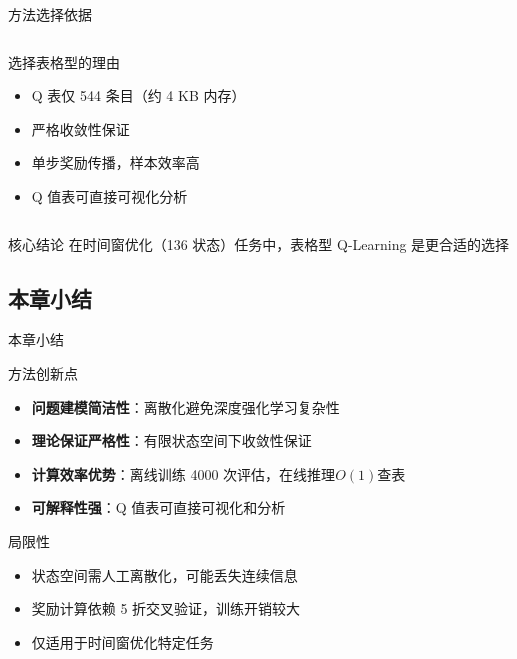 {\begin{frame}{方法选择依据}
\begin{columns}[T]
        \begin{alertblock}{选择表格型的理由}
            \footnotesize
            \begin{itemize}
                \item Q 表仅 544 条目（约 4 KB 内存）
                \item 严格收敛性保证
                \item 单步奖励传播，样本效率高
                \item Q 值表可直接可视化分析
            \end{itemize}
        \end{alertblock}
    \end{columns}

    \vspace{0.2cm}
    \begin{exampleblock}{核心结论}
        \footnotesize
        在时间窗优化（136 状态）任务中，表格型 Q-Learning 是更合适的选择
    \end{exampleblock}
\end{frame}

\subsection{本章小结}

\begin{frame}{本章小结}
    \begin{block}{方法创新点}
        \footnotesize
        \begin{itemize}
            \item \textbf{问题建模简洁性}：离散化避免深度强化学习复杂性
            \item \textbf{理论保证严格性}：有限状态空间下收敛性保证
            \item \textbf{计算效率优势}：离线训练 4000 次评估，在线推理$O(1)$查表
            \item \textbf{可解释性强}：Q 值表可直接可视化和分析
        \end{itemize}
    \end{block}

    \vspace{0.2cm}
    \begin{alertblock}{局限性}
        \footnotesize
        \begin{itemize}
            \item 状态空间需人工离散化，可能丢失连续信息
            \item 奖励计算依赖 5 折交叉验证，训练开销较大
            \item 仅适用于时间窗优化特定任务
        \end{itemize}
    \end{alertblock}
\end{frame}

} %
